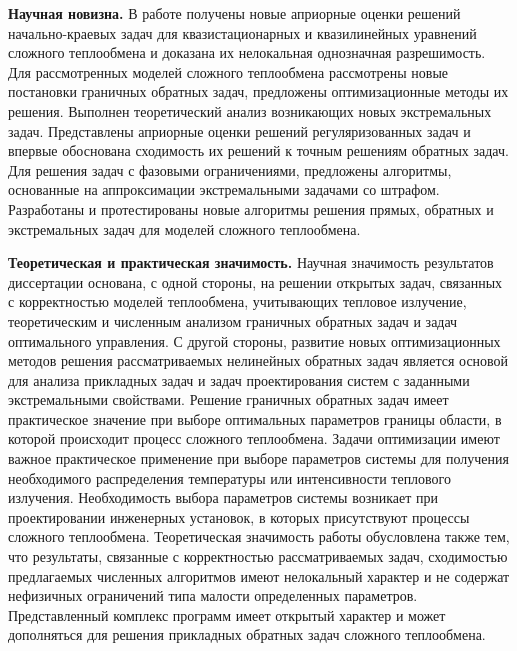     \textbf{Научная новизна.}
    В работе получены новые априорные оценки решений
    начально-краевых задач для квазистационарных и квазилинейных уравнений
    сложного теплообмена и доказана их нелокальная однозначная
    разрешимость.
    Для рассмотренных моделей сложного теплообмена
    рассмотрены новые постановки граничных обратных задач, предложены
    оптимизационные методы их решения.
    Выполнен теоретический анализ возникающих новых экстремальных задач.
    Представлены априорные оценки решений регуляризованных задач и впервые
    обоснована сходимость их решений к точным решениям обратных задач.
    Для решения задач с фазовыми ограничениями, предложены алгоритмы,
    основанные на аппроксимации экстремальными задачами со штрафом.
    Разработаны и протестированы новые алгоритмы решения прямых,
    обратных и экстремальных задач для моделей сложного теплообмена.


    \textbf{Теоретическая и практическая значимость.}
    Научная значимость результатов диссертации основана, с одной
    стороны, на решении открытых задач, связанных с корректностью моделей
    теплообмена, учитывающих тепловое излучение, теоретическим и
    численным анализом граничных обратных задач и задач оптимального
    управления.
    С другой стороны, развитие новых оптимизационных методов
    решения рассматриваемых нелинейных обратных задач является основой для
    анализа прикладных задач и задач проектирования систем с заданными
    экстремальными свойствами.
    Решение граничных обратных задач имеет практическое значение при
    выборе оптимальных параметров границы области, в которой происходит
    процесс сложного теплообмена.
    Задачи оптимизации имеют важное
    практическое применение при выборе параметров системы для получения
    необходимого распределения температуры или интенсивности теплового излучения.
    Необходимость выбора параметров системы возникает при проектировании
    инженерных установок, в которых присутствуют процессы сложного
    теплообмена.
    Теоретическая значимость работы обусловлена также тем, что
    результаты, связанные с корректностью рассматриваемых задач,
    сходимостью предлагаемых численных алгоритмов имеют нелокальный
    характер и не содержат нефизичных ограничений типа малости
    определенных параметров.
    Представленный комплекс программ имеет открытый характер и может
    дополняться для решения прикладных обратных задач сложного
    теплообмена.


